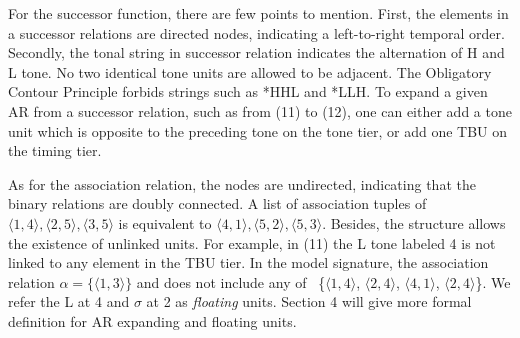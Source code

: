 \documentclass[11pt,letterpaper]{article}
\begin{document}
For the successor function, there are few points to mention. First, the elements in a successor relations are directed nodes, indicating a left-to-right temporal order. Secondly, the tonal string in successor relation indicates the alternation of H and L tone. No two identical tone units are allowed to be adjacent. The Obligatory Contour Principle forbids strings such as *HHL and *LLH. To expand a given AR from a successor relation, such as from (11) to (12), one can either add a tone unit which is opposite to the preceding tone on the tone tier, or add one TBU on the timing tier. 
\begin{multicols}{2}
	\ea  	
	\z
	\ea  
{}
\z

\end{multicols}

As for the association relation, the nodes are undirected, indicating that the binary relations are doubly connected. A list of association tuples of $\langle 1, 4 \rangle, \langle 2, 5 \rangle, \langle 3, 5 \rangle$ is equivalent to  $\langle 4, 1 \rangle, \langle 5, 2 \rangle, \langle 5, 3 \rangle$. Besides, the structure allows the existence of unlinked units. For example, in (11) the L tone labeled 4 is not linked to any element in the TBU tier. In the model signature, the association relation \(\alpha = \{\langle 1,3 \rangle\}\) and does not include any of \ \{$\langle 1,4 \rangle$, $\langle 2,4 \rangle$, $\langle 4,1 \rangle$, $\langle2,4\rangle$\}. We refer the L at 4 and \(\sigma\) at 2 as \textit{floating} units. Section 4 will give more formal definition for AR expanding and floating units.
\end{document}
